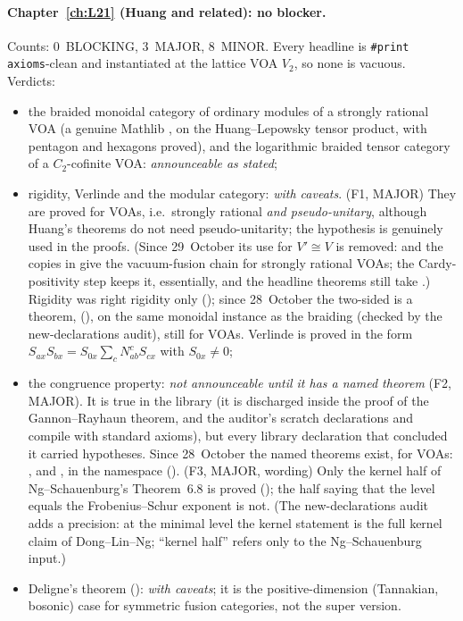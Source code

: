 \paragraph{Chapter~\ref{ch:L21} (Huang and related): no blocker.} Counts: 0~BLOCKING, 3~MAJOR, 8~MINOR. Every headline is
\texttt{\#print axioms}-clean and instantiated at the lattice VOA $V_2$, so none is vacuous. Verdicts:
\begin{itemize}
\item the braided monoidal category of ordinary modules of a strongly rational VOA (a genuine Mathlib
  , on the Huang--Lepowsky tensor product, with pentagon and hexagons proved), and the logarithmic
  braided tensor category of a $C_2$-cofinite VOA: \emph{announceable as stated};
\item rigidity, Verlinde and the modular category: \emph{with caveats}. (F1, MAJOR) They are proved for  VOAs,
  i.e.\ strongly rational \emph{and pseudo-unitary}, although Huang's theorems do not need pseudo-unitarity; the
  hypothesis is genuinely used in the proofs. (Since 29~October its use for $V'\cong V$ is removed:
   and the  copies in
   give the vacuum-fusion chain for strongly rational VOAs; the
  Cardy-positivity step  keeps it, essentially, and the headline theorems still take .) Rigidity was right rigidity only (); since
  28~October the two-sided  is a theorem, 
  (), on the same monoidal instance as the braiding (checked by the
  new-declarations audit), still for  VOAs. Verlinde is proved in the form
  $S_{ax}S_{bx}=S_{0x}\sum_cN_{ab}^cS_{cx}$ with $S_{0x}\neq0$;
\item the congruence property: \emph{not announceable until it has a named theorem} (F2, MAJOR). It is true in the
  library (it is discharged inside the proof of the Gannon--Rayhaun theorem, and the auditor's scratch declarations
   and  compile with standard axioms), but every library declaration
  that concluded it carried hypotheses. Since 28~October the named theorems exist, for  VOAs:
  ,  and , in
  the namespace  (). (F3, MAJOR, wording) Only the kernel half of Ng--Schauenburg's Theorem~6.8 is
  proved (); the half saying that the level equals the Frobenius--Schur exponent is
  not. (The new-declarations audit adds a precision: at the minimal level the kernel statement is the full kernel
  claim of Dong--Lin--Ng; ``kernel half'' refers only to the Ng--Schauenburg input.)
\item Deligne's theorem (): \emph{with caveats}; it is the positive-dimension (Tannakian,
  bosonic) case for symmetric fusion categories, not the super version.
\end{itemize}


